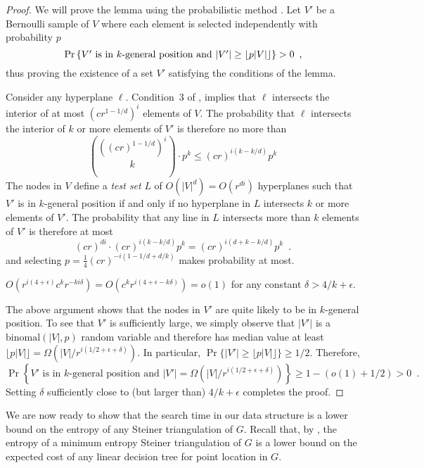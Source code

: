 \documentclass{patmorin}
\begin{document}
\begin{proof}
  We will prove the lemma using the probabilistic method \cite{as08}.
  Let $V'$ be a Bernoulli sample of $V$ where each element is selected
  independently with probability $p$
  \[
     \Pr\left\{
        \mbox{$V'$ is in $k$-general position 
          and $|V'| \ge {\left\lfloor p|V| \right\rfloor}$}
      \right\} > 0 \enspace ,
  \]
  thus proving the existence of a set $V'$ satisfying the conditions of
  the lemma.

  Consider any hyperplane $\ell$. Condition~3 of
  , implies that $\ell$ intersects the
  interior of at most $(cr^{1-1/d})^{i}$ elements of $V$.
  The probability that $\ell$ intersects the interior of $k$ or more
  elements of $V'$ is therefore no more than
  \[
    \binom{((cr)^{1-1/d})^{i}}{k}\cdot p^k
    \le (cr)^{i(k-k/d)}p^k
  \]
  The nodes in $V$ define a \emph{test set} $L$ of $O(|V|^d)=O(r^{di})$
  hyperplanes such that $V'$ is in $k$-general position if and only
  if no hyperplane in $L$ intersects $k$ or more elements of $V'$. The
  probability that any line in $L$ intersects more than $k$ elements of
  $V'$ is therefore at most
  \[
    (cr)^{di}\cdot(cr)^{i(k-k/d)}p^k = (cr)^{i(d+k-k/d)}p^k \enspace .
  \]
  and selecting $p=\frac{1}{4}(cr)^{-i(1-1/d+d/k)}$ makes probability at most.

$O(r^{i(4+\epsilon)}c^kr^{-ki\delta})=O(c^kr^{i(4+\epsilon-k\delta)})=o(1)$ for any
  constant $\delta > 4/k+\epsilon$.

  The above argument shows that the nodes in $V'$ are quite likely
  to be in $k$-general position.  To see that $V'$ is sufficiently
  large, we simply observe that $|V'|$ is a $\mathrm{binomal}(|V|,p)$
  random variable and therefore has median value at least
  $\lfloor{p|V|}\rfloor=\Omega(|V|/r^{i(1/2+\epsilon + \delta)})$.
  In particular, $\Pr\{|V'|\ge \lfloor{p|V|}\rfloor\}\ge 1/2$.  Therefore,
  \[
     \Pr\left\{
        \mbox{$V'$ is in $k$-general position 
          and $|V'|=\Omega(|V|/r^{i(1/2+\epsilon+\delta)})$}
      \right\} \ge 1- (o(1) + 1/2) > 0 \enspace .
  \]
  Setting $\delta$ sufficiently close to (but larger than) $4/k+\epsilon$
  completes the proof.
\end{proof}

We are now ready to show that the search time in our data structure
is a lower bound on the entropy of any Steiner triangulation of $G$.
Recall that, by , the entropy of a minimum entropy
Steiner triangulation of $G$ is a lower bound on the expected cost of
any linear decision tree for point location in $G$.
\end{document}
